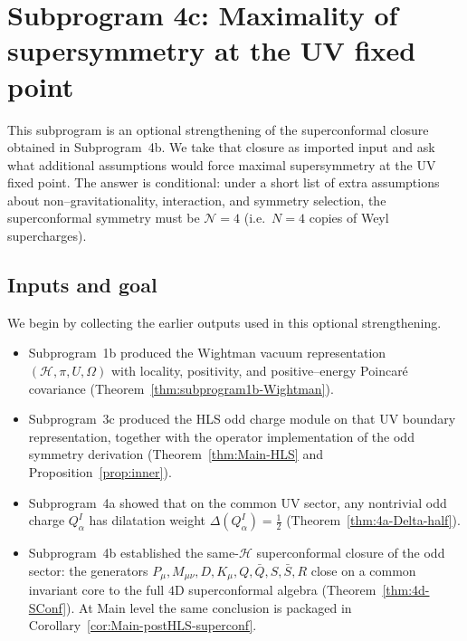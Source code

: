 \section{Subprogram 4c: Maximality of supersymmetry at the UV fixed point}
\label{sec:subprogram4c}

This subprogram is an optional strengthening of the superconformal
closure obtained in Subprogram~4b. We take that closure as imported
input and ask what additional assumptions would force maximal
supersymmetry at the UV fixed point. The answer is conditional:
under a short list of extra assumptions about non--gravitationality,
interaction, and symmetry selection, the superconformal symmetry must be
\(\mathcal N=4\) (i.e.\ \(N=4\) copies of Weyl supercharges).

\subsection{Inputs and goal}
\label{subsec:4c-inputs-goal}

We begin by collecting the earlier outputs used in this optional
strengthening.

\begin{itemize}
  \item Subprogram~1b produced the Wightman vacuum representation
        \((\mathcal H,\pi,U,\Omega)\) with locality, positivity, and
        positive--energy Poincar\'e covariance
        (Theorem~\ref{thm:subprogram1b-Wightman}).

  \item Subprogram~3c produced the HLS odd charge module on that UV
        boundary representation, together with the operator
        implementation of the odd symmetry derivation
        (Theorem~\ref{thm:Main-HLS} and
        Proposition~\ref{prop:inner}).

  \item Subprogram~4a showed that on the common UV sector, any
        nontrivial odd charge \(Q_\alpha^I\) has dilatation weight
        \(\Delta(Q_\alpha^I)=\tfrac12\)
        (Theorem~\ref{thm:4a-Delta-half}).

  \item Subprogram~4b established the same-\(\mathcal H\)
        superconformal closure of the odd sector: the generators
        \(P_\mu,M_{\mu\nu},D,K_\mu,Q,\bar Q,S,\bar S,R\) close on a
        common invariant core to the full \(4\)D superconformal algebra
        (Theorem~\ref{thm:4d-SConf}). At Main level the same conclusion
        is packaged in Corollary~\ref{cor:Main-postHLS-superconf}.
\end{itemize}

